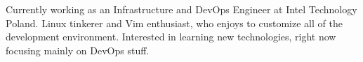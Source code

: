 
\begin{cvparagraph}
Currently working as an Infrastructure and DevOps Engineer at Intel Technology Poland. Linux tinkerer and Vim enthusiast, who enjoys to customize all of the development environment. Interested in learning new technologies, right now focusing mainly on DevOps stuff.
\end{cvparagraph}
